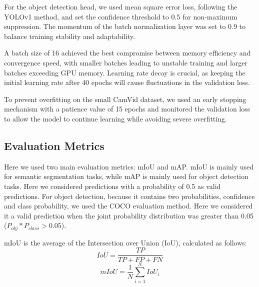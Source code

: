 \documentclass[conference]{IEEEtran}
\begin{document}
For the object detection head, we used mean square error loss, following the YOLOv1 method, and set the confidence threshold to 0.5 for non-maximum suppression. The momentum of the batch normalization layer was set to 0.9 to balance training stability and adaptability.

A batch size of 16 achieved the best compromise between memory efficiency and convergence speed, with smaller batches leading to unstable training and larger batches exceeding GPU memory. Learning rate decay is crucial, as keeping the initial learning rate after 40 epochs will cause fluctuations in the validation loss.

To prevent overfitting on the small CamVid dataset, we used an early stopping mechanism with a patience value of 15 epochs and monitored the validation loss to allow the model to continue learning while avoiding severe overfitting.



\subsection{Evaluation Metrics}


Here we used two main evaluation metrics: mIoU and mAP. mIoU is mainly used for semantic segmentation tasks, while mAP is mainly used for object detection tasks. Here we considered predictions with a probability of 0.5 as valid predictions. For object detection, because it contains two probabilities, confidence and class probability, we used the COCO evaluation method.\cite{b5} Here we considered it a valid prediction when the joint probability distribution was greater than 0.05 ($P_{obj} * P_{class} > 0.05$).


mIoU is the average of the Intersection over Union (IoU), calculated as follows:
\[IoU = \frac{TP}{TP + FP + FN}\]
\[mIoU = \frac{1}{N} \sum_{i=1}^{N} IoU_i\]

\end{document}

